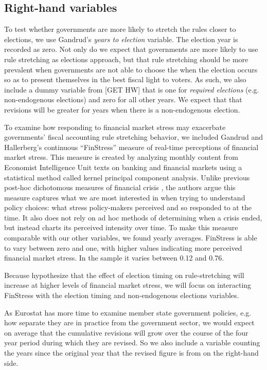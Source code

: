 \documentclass[]{article}
\begin{document}
\subsection{Right-hand variables}

To test whether governments are more likely to stretch the rules closer to elections, we use Gandrud's \citeyearpar{gandrudYrcurnt} \emph{years to election} variable. The election year is recorded as zero. Not only do we expect that governments are more likely to use rule stretching as elections approach, but that rule stretching should be more prevalent when governments are not able to choose the when the election occurs so as to present themselves in the best fiscal light to voters. As such, we also include a dummy variable from [GET HW] that is one for \emph{required elections} (e.g. non-endogenous elections) and zero for all other years. We expect that that revisions will be greater for years when there is a non-endogenous election.

To examine how responding to financial market stress may exacerbate governments' fiscal accounting rule stretching behavior, we included Gandrud and Hallerberg's \citeyearpar{finstress_paper} continuous ``FinStress'' measure of real-time perceptions of financial market stress. This measure is created by analyzing monthly content from Economist Intelligence Unit texts on banking and financial markets using a statistical method called kernel principal component analysis. Unlike previous post-hoc dichotomous measures of financial crisis \citep[e.g. measures compiled by][]{Laeven2012,ReinhartRog2010}, the authors argue this measure captures what we are most interested in when trying to understand policy choices: what stress policy-makers perceived and so responded to at the time. It also does not rely on ad hoc methods of determining when a crisis ended, but instead charts its perceived intensity over time. To make this measure comparable with our other variables, we found yearly averages. FinStress is able to vary between zero and one, with higher values indicating more perceived financial market stress. In the sample it varies between 0.12 and 0.76.

Because hypothesize that the effect of election timing on rule-stretching will increase at higher levels of financial market stress, we will focus on interacting FinStress with the election timing and non-endogenous elections variables.

As Eurostat has more time to examine member state government policies, e.g. how separate they are in practice from the government sector, we would expect on average that the cumulative revisions will grow over the course of the four year period during which they are revised. So we also include a variable counting the years since the original year that the revised figure is from on the right-hand side.
\end{document}
